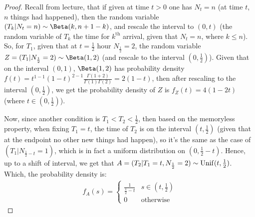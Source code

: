 \documentclass{article}
\begin{document}
\begin{proof}
    Recall from lecture, that if given at time $t>0$ one has $N_t=n$ (at time $t$, $n$ things had happened), then the random variable $(T_k|N_t = n) \sim \Beta(k, n+1-k)$, and rescale the interval to $(0,t)$ (the random variable of $T_k$ the time for $k^\text{th}$ arrival, given that $N_t=n$, where $k\leq n$). So, for $T_1$, given that at $t=\frac{1}{2}$ hour $N_\frac{1}{2}=2$, the random variable $Z = (T_1|N_\frac{1}{2}=2)\sim \Beta(1,2)$ (and rescale to the interval $(0,\frac{1}{2})$). Given that on the interval $(0,1)$, $\Beta(1,2)$ has probability density $f(t) = t^{1-1}(1-t)^{2-1}\frac{\Gamma(1+2)}{\Gamma(1)\Gamma(2)} = 2(1-t)$, then after rescaling to the interval $(0,\frac{1}{2})$, we get the probability density of $Z$ is $f_Z(t) = 4(1-2t)$ (where $t\in(0,\frac{1}{2})$).

    Now, since another condition is $T_1 < T_2 < \frac{1}{2}$, then based on the memoryless property, when fixing $T_1 = t$, the time of $T_2$ is on the interval $(t,\frac{1}{2})$ (given that at the endpoint no other new things had happen), so it's the same as the case of $(T_1 | N_{\frac{1}{2}-t}=1)$, which is in fact a uniform distribution on $(0,\frac{1}{2}-t)$. Hence, up to a shift of interval, we get that $A = (T_2 | T_1=t, N_\frac{1}{2}=2) \sim \mathrm{Unif}(t,\frac{1}{2})$. Which, the probability density is: 
    \begin{align}
        f_A(s)=\begin{cases}
            \frac{1}{\frac{1}{2}-t} & s\in (t,\frac{1}{2})\\
            0 & \text{otherwise}
        \end{cases}
    \end{align} 

    \hfil


\end{proof}
\end{document}

